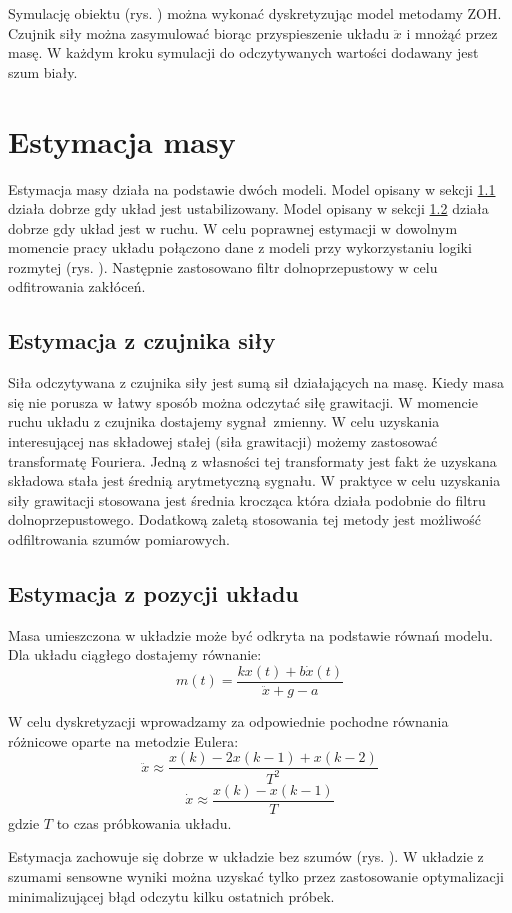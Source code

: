 \documentclass[a4paper]{article}
\begin{document}
Symulację obiektu (rys. ) można wykonać dyskretyzując model metodamy ZOH. Czujnik siły można zasymulować biorąc przyspieszenie układu $\ddot{x}$ i mnożąć przez masę. W każdym kroku symulacji do odczytywanych wartości dodawany jest szum biały.

\section{Estymacja masy}
Estymacja masy działa na podstawie dwóch modeli. Model opisany w sekcji \ref{fs} działa dobrze gdy układ jest ustabilizowany. Model opisany w sekcji \ref{pos} działa dobrze gdy układ jest w ruchu. W celu poprawnej estymacji w dowolnym momencie pracy układu połączono dane z modeli przy wykorzystaniu logiki rozmytej (rys. ). Następnie zastosowano filtr dolnoprzepustowy w celu odfitrowania zakłóceń.
  
\subsection{Estymacja z czujnika siły}
\label{fs}
Siła odczytywana z czujnika siły jest sumą sił działających na masę. Kiedy masa się nie porusza w łatwy sposób można odczytać siłę grawitacji. W momencie ruchu układu z czujnika dostajemy sygnał zmienny. W celu uzyskania interesującej nas składowej stałej (siła grawitacji) możemy zastosować transformatę Fouriera. Jedną z własności tej transformaty jest fakt że uzyskana składowa stała jest średnią arytmetyczną sygnału. W praktyce w celu uzyskania siły grawitacji stosowana jest średnia krocząca która działa podobnie do filtru dolnoprzepustowego. Dodatkową zaletą stosowania tej metody jest możliwość odfiltrowania szumów pomiarowych.

\subsection{Estymacja z pozycji układu}
\label{pos}
Masa umieszczona w układzie może być odkryta na podstawie równań modelu. Dla układu ciągłego dostajemy równanie:
\[ m(t) = \frac{kx(t) + b\dot{x}(t)}{\ddot{x}+g-a}\]

W celu dyskretyzacji wprowadzamy za odpowiednie pochodne równania różnicowe oparte na metodzie Eulera:
\[\ddot{x} \approx \frac{x(k)-2x(k-1)+x(k-2)}{T^2}\]
\[\dot{x} \approx \frac{x(k)-x(k-1)}{T}\]
gdzie $T$ to czas próbkowania układu.

Estymacja zachowuje się dobrze w układzie bez szumów (rys. ). W układzie z szumami sensowne wyniki można uzyskać tylko przez zastosowanie optymalizacji minimalizującej błąd odczytu kilku ostatnich próbek.
\end{document}

